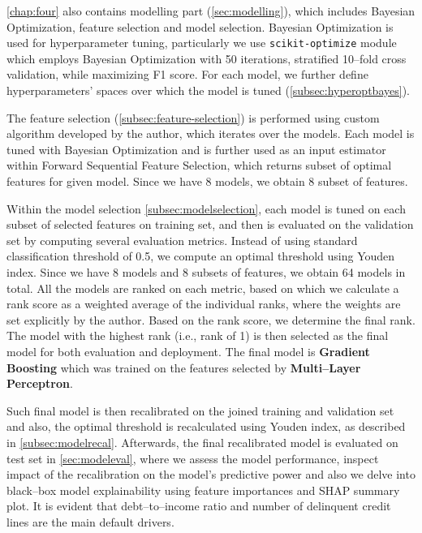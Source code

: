 \autoref{chap:four} also contains modelling part (\autoref{sec:modelling}), which includes Bayesian Optimization, feature selection and model selection.
Bayesian Optimization is used for hyperparameter tuning, particularly we use \lstinline{scikit-optimize} module which employs Bayesian Optimization with 50 iterations, stratified 10--fold cross validation, while maximizing F1 score. For each model, we further define hyperparameters' spaces over which the model is tuned (\autoref{subsec:hyperoptbayes}).

The feature selection (\autoref{subsec:feature-selection}) is performed using custom algorithm developed by the author, which iterates over the models. Each model is tuned with Bayesian Optimization and is further used as an input estimator within Forward Sequential Feature Selection, which returns subset of optimal features for given model. Since we have 8 models, we obtain 8 subset of features.

Within the model selection \autoref{subsec:modelselection}, each model is tuned on each subset of selected features on training set, and then is evaluated on the validation set by computing several evaluation metrics.
Instead of using standard classification threshold of 0.5, we compute an optimal threshold using Youden index. Since we have 8 models and 8 subsets of features, we obtain 64 models in total.
All the models are ranked on each metric, based on which we calculate a rank score as a weighted average of the individual ranks, where the weights are set explicitly by the author. Based on the rank score, we determine the final rank. The model with the highest rank (i.e., rank of 1) is then selected as the final model for both evaluation and deployment.
The final model is \textbf{Gradient Boosting} which was trained on the features selected by \textbf{Multi--Layer Perceptron}.

Such final model is then recalibrated on the joined training and validation set and also, the optimal threshold is recalculated using Youden index, as described in \autoref{subsec:modelrecal}.
Afterwards, the final recalibrated model is evaluated on test set in \autoref{sec:modeleval}, where we assess the model performance, inspect impact of the recalibration on the model's predictive power and also we delve into black--box model explainability using feature importances and SHAP summary plot. It is evident that debt--to--income ratio and number of delinquent credit lines are the main default drivers.

